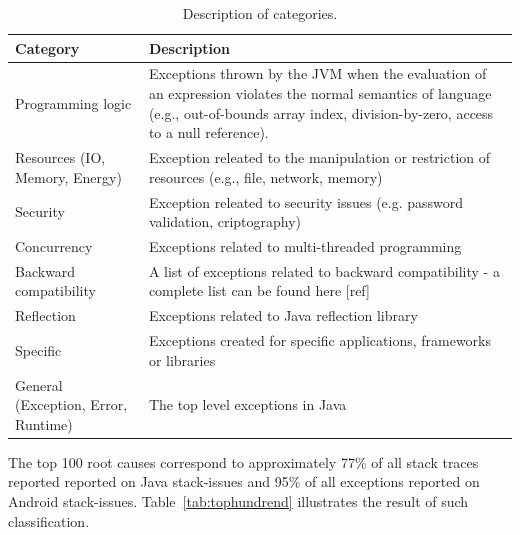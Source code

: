 \documentclass[conference]{IEEEtran}
\begin{document}
\begin{table}
  \centering
  \begin{tabular}{|p{2cm}| p{5cm}|}
    \hline
    \bfseries{Category} & \bfseries{Description} \\
    \hline
      Programming logic &  Exceptions thrown by the JVM when the 
evaluation of an expression violates the normal semantics of language (e.g., 
out-of-bounds array index, division-by-zero, access to a null reference). \\ \hline
      Resources (IO, Memory, Energy)  & Exception releated to the manipulation or restriction of resources (e.g., file, network, memory) \\ \hline
      Security                               & Exception releated to security issues (e.g. password validation, criptography) \\ \hline
      Concurrency                            & Exceptions related to multi-threaded programming \\ \hline
      Backward compatibility                 &  A list of exceptions related to backward compatibility - a complete list can be found here [ref]  \\ \hline
      Reflection                             & Exceptions related to Java reflection library  \\ \hline
      Specific                & Exceptions created for specific applications, frameworks or libraries \\ \hline
      General (Exception, Error, Runtime)    & The top level exceptions in Java    \\ \hline
    \hline
  \end{tabular}
  \caption{Description of categories.}
  \label{tab:categories}
\end{table}

The top 100 root causes correspond to approximately 77\% of all stack traces
reported reported on Java stack-issues and 95\% of all exceptions reported on
Android stack-issues. Table~\ref{tab:tophundrend} illustrates the result of such 
classification.
\end{document}
